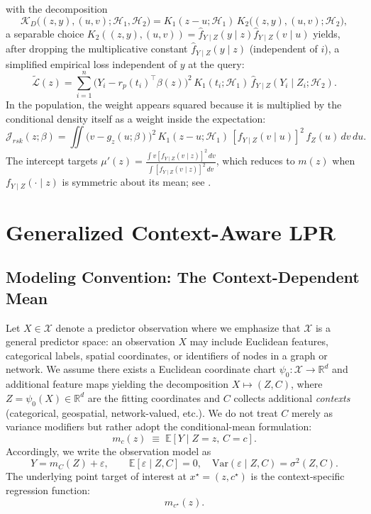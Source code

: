 \documentclass[final,1p,times,authoryear]{elsarticle}
\newcommand{\R}{\mathbb{R}}
\newcommand{\K}{\mathcal{K}}
\newcommand{\Lcal}{\mathcal{L}}
\newcommand{\Hcal}{\mathcal{H}}
\newcommand{\Jcal}{\mathcal{J}}
\begin{document}
with the decomposition
\begin{equation}
\K_D\big((z,y),(u,v);\Hcal_1,\Hcal_2\big)
=K_1(z-u;\Hcal_1)\,K_2\big((z,y),(u,v);\Hcal_2\big),
\end{equation}
a separable choice $K_2((z,y),(u,v))=\hat f_{Y\mid Z}(y\mid z)\hat f_{Y\mid Z}(v\mid u)$ yields,
after dropping the multiplicative constant $\hat f_{Y \mid Z}(y \mid z)$ (independent of $i$),
a simplified empirical loss independent of $y$ at the query:
\begin{equation}
\label{eq:rsk_simple_loss}
\tilde{\Lcal}(z)
=\sum_{i=1}^{n}\Big(Y_i-r_p(t_i)^\top\beta(z)\Big)^2\,K_1(t_i;\Hcal_1)\,\hat f_{Y \mid Z}(Y_i \mid Z_i;\Hcal_2).
\end{equation}
In the population, the weight appears squared because it is multiplied by the conditional density itself as a weight inside the expectation:
\begin{equation}
\label{eq:rsk_pop}
\Jcal_{rsk}(z;\beta)
=\iint \big(v-g_z(u;\beta)\big)^2\,K_1(z-u;\Hcal_1)\,[f_{Y \mid Z}(v \mid u)]^2\,f_Z(u)\,dv\,du.
\end{equation}
The intercept targets $\mu'(z)=\frac{\int v[f_{Y \mid Z}(v \mid z)]^2\,dv}{\int [f_{Y \mid Z}(v \mid z)]^2\,dv}$, which reduces to $m(z)$ when $f_{Y \mid Z}(\cdot \mid z)$ is symmetric about its mean; see \citep{shulman2025robust}. \newline


\section{Generalized Context-Aware LPR}
\label{s:Generalized Context-Aware LPR}

\subsection{Modeling Convention: The Context-Dependent Mean}
\label{s:gc_convention}

Let $X \in \mathcal{X}$ denote a predictor observation where we emphasize that $\mathcal{X}$ is a general predictor space: an observation $X$ may include Euclidean features, categorical labels, spatial coordinates, or identifiers of nodes in a graph or network. We assume there exists a Euclidean coordinate chart $\psi_0:\mathcal{X}\to\R^d$ and additional feature maps yielding the decomposition $X \mapsto (Z,C)$, where $Z=\psi_0(X)\in \R^d$ are the fitting coordinates and $C$ collects additional \emph{contexts} (categorical, geospatial, network-valued, etc.). We do not treat $C$ merely as variance modifiers but rather adopt the conditional-mean formulation:
\[
m_c(z) \;\equiv\; \mathbb{E}\!\left[Y \mid Z = z,\, C = c\right].
\]
Accordingly, we write the observation model as
\[
Y = m_C(Z) + \varepsilon,
\qquad
\mathbb{E}[\varepsilon \mid Z,C] = 0, \quad \mathrm{Var}(\varepsilon \mid Z,C) = \sigma^2(Z,C).
\]
The underlying point target of interest at \( x^\star = (z, c^\star) \) is the context-specific regression function:
\[
m_{c^\star}(z).
\]
\end{document}
